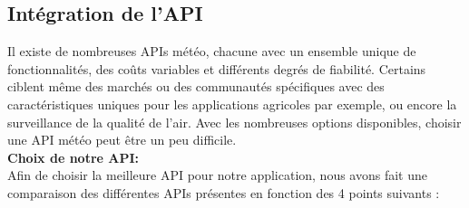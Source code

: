 \documentclass[12pt, french]{article}
\begin{document}
		\subsection{Intégration de l'API}
		
		Il existe de nombreuses APIs météo, chacune avec un ensemble unique de fonctionnalités, des coûts variables et différents degrés de fiabilité. Certains ciblent même des marchés ou des communautés spécifiques avec des caractéristiques uniques pour les applications agricoles par exemple, ou encore la surveillance de la qualité de l'air. Avec les nombreuses options disponibles, choisir une API météo peut être un peu difficile.\newline~~\\
        \textbf{Choix de notre API:}~~\\
        Afin de choisir la meilleure API pour notre application, nous avons fait une comparaison des différentes APIs présentes en fonction des 4 points suivants :\newline
\end{document}
